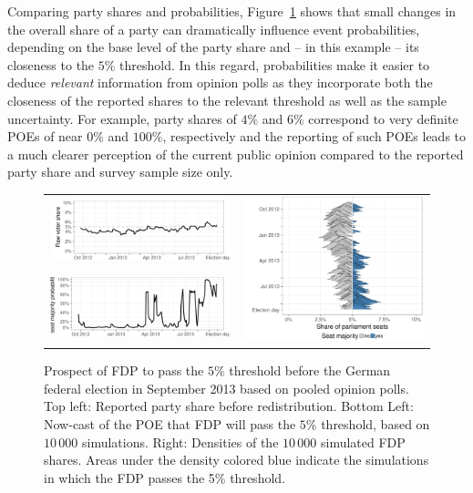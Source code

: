 \documentclass[smallcondensed]{svjour3}     %
\begin{document}
Comparing party shares and probabilities, Figure~\ref{fig:2013_fdp} shows
that small changes in the overall share of a party can dramatically influence
event probabilities, depending on the base level of the party share and
-- in this example -- its closeness to the $5\%$ threshold.
In this regard, probabilities make it easier to deduce {\it relevant} information
from opinion polls as they incorporate both the closeness of the reported shares
to the relevant threshold as well as the sample uncertainty.
For example, party shares of $4\%$ and $6\%$
correspond to very definite POEs of near $0\%$ and $100\%$,
respectively and the reporting of such POEs leads to a much clearer perception
of the current public opinion compared to the reported party share and
survey sample size only.

\begin{figure}[H]\centering
\begin{tabular}{ll}
\includegraphics[height=.15\textwidth]{figures/2013_pooled_fdp_rawShares.pdf}
&
\multirow{2}{*}[13ex]{\includegraphics[height=30ex]{figures/2013_pooled_fdp_ridgeline.pdf}}
\\
\includegraphics[height=.15\textwidth]{figures/2013_pooled_fdp_passingProb.pdf}
\end{tabular}
\caption{Prospect of FDP to pass the $5\%$ threshold before the
German federal election in September 2013 based on pooled opinion polls.
Top left: Reported party share before redistribution. Bottom Left: Now-cast
of the POE that FDP will pass the $5\%$ threshold, based on $10\,000$ simulations.
Right: Densities of the $10\,000$ simulated FDP shares. Areas under
the density colored blue indicate the simulations in which the FDP passes the
5\% threshold.
\label{fig:2013_fdp}
}
\end{figure}
\end{document}
